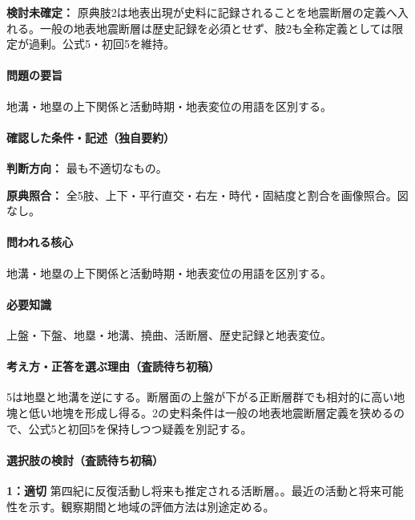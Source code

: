 \par\textbf{検討未確定：} 原典肢2は地表出現が史料に記録されることを地震断層の定義へ入れる。一般の地表地震断層は歴史記録を必須とせず、肢2も全称定義としては限定が過剰。公式5・初回5を維持。

\paragraph{問題の要旨} 地溝・地塁の上下関係と活動時期・地表変位の用語を区別する。

\paragraph{確認した条件・記述（独自要約）}\mbox{}\par

\noindent\textbf{判断方向：} 最も不適切なもの。\par

\noindent\textbf{原典照合：} 全5肢、上下・平行直交・右左・時代・固結度と割合を画像照合。図なし。\par

\paragraph{問われる核心} 地溝・地塁の上下関係と活動時期・地表変位の用語を区別する。

\paragraph{必要知識} 上盤・下盤、地塁・地溝、撓曲、活断層、歴史記録と地表変位。

\paragraph{考え方・正答を選ぶ理由（査読待ち初稿）} 5は地塁と地溝を逆にする。断層面の上盤が下がる正断層群でも相対的に高い地塊と低い地塊を形成し得る。2の史料条件は一般の地表地震断層定義を狭めるので、公式5と初回5を保持しつつ疑義を別記する。

\paragraph{選択肢の検討（査読待ち初稿）}\mbox{}\par

\noindent\textbf{1：適切} 第四紀に反復活動し将来も推定される活断層。。最近の活動と将来可能性を示す。観察期間と地域の評価方法は別途定める。\par

